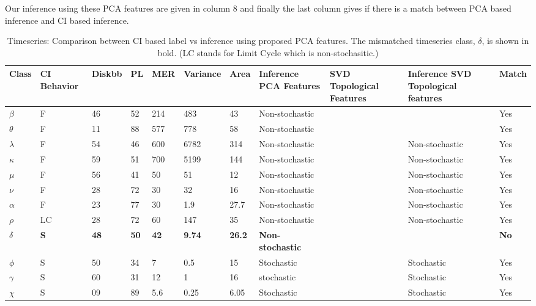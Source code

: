 \documentclass[10pt,conference]{IEEEtran}
\begin{document}
Our inference using these PCA features are given in column 8 and finally the last column gives if there is a match between PCA based inference and CI based inference.

\begin{table}[t]
\caption{Timeseries: Comparison between CI based label vs inference using proposed PCA features. The mismatched timeseries class, $\delta$, is shown in bold. (LC stands for Limit Cycle \cite{Adegoke2018} which is non-stochasitic.)}
\begin{center}
  \begin{tabular}{|p{0.5cm}|p{1cm}|p{0.75cm}|p{0.5cm}|p{0.75cm}|p{1cm}|p{0.5cm}|p{1.8cm}|p{2.5cm}|p{3cm}|p{0.75cm}|}
\hline
Class & CI \newline Behavior & Diskbb & PL & MER & Variance & Area & Inference \newline PCA Features & SVD \newline Topological Features & Inference \newline SVD Topological features & Match \\
\hline
$\beta$ & F & 46 & 52 & 214 & 483 & 43 & Non-stochastic & &&Yes\\
\hline
$\theta$ & F & 11 &  88 & 577 & 778 & 58&Non-stochastic & &&Yes \\
\hline
$\lambda$ & F & 54 & 46 & 600 & 6782 & 314 & Non-stochastic & &Non-stochastic&Yes \\
\hline
$\kappa$ & F & 59 & 51 & 700 & 5199 & 144 & Non-stochastic & &Non-stochastic&Yes \\
\hline
$\mu$ & F & 56 & 41 & 50 & 51 & 12 & Non-stochastic & &Non-stochastic&Yes \\
\hline
$\nu$ & F & 28 & 72 & 30 & 32 & 16 & Non-stochastic & &Non-stochastic&Yes\\
\hline
$\alpha$ & F & 23 & 77 & 30 & 1.9 & 27.7 & Non-stochastic & &Non-stochastic&Yes \\
\hline
$\rho$ & LC & 28 & 72 & 60 & 147 & 35 & Non-stochastic & &Non-stochastic&Yes \\
\hline
\textbf{$\delta$} & \textbf{S} & \textbf{48} & \textbf{50} & \textbf{42} & \textbf{9.74} & \textbf{26.2} & \textbf{Non-stochastic} &&& \textbf{No} \\
\hline
$\phi$ & S & 50 & 34 & 7 & 0.5 & 15 & Stochastic &&Stochastic& Yes \\
\hline
$\gamma$ & S & 60 & 31 & 12 & 1 & 16 & stochastic &&Stochastic& Yes \\
\hline
$\chi$ & S & 09 & 89 & 5.6 & 0.25 & 6.05 & Stochastic &&Stochastic& Yes \\
\hline
\end{tabular}
\label{tab:results}
\end{center}
\end{table}
\end{document}
